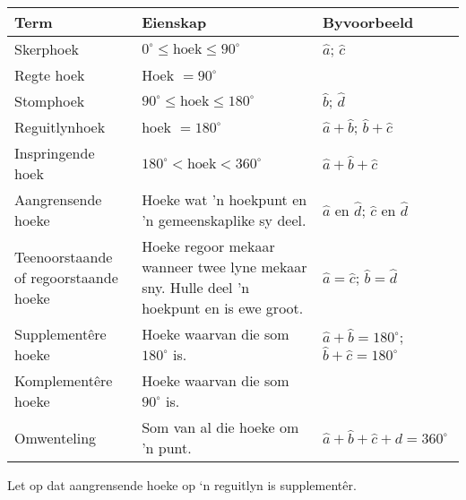 \begin{table}[H]
\begin{center}
\begin{tabular}{|p{3.5cm}|p{4cm}|p{4cm}|} \hline
\textbf{Term} & \textbf{Eienskap} & \textbf{Byvoorbeeld} \\ \hline
Skerphoek & $0^{\circ} \leq \mbox{hoek} \leq 90^{\circ}$ & $\hat{a}$; $\hat{c}$ \\ \hline
Regte hoek & Hoek $= 90^{\circ}$ &  \\ \hline
Stomphoek & $90^{\circ} \leq \mbox{hoek} \leq 180^{\circ}$ & $\hat{b}$; $\hat{d}$ \\ \hline
Reguitlynhoek & hoek $= 180^{\circ}$ & $\hat{a} + \hat{b}$; $\hat{b} + \hat{c}$  \\ \hline
Inspringende hoek & $180^{\circ} < \mbox{hoek} < 360^{\circ}$ &  $\hat{a} + \hat{b} + \hat{c}$\\ \hline
Aangrensende hoeke & Hoeke wat 'n hoekpunt en 'n gemeenskaplike sy deel. & $\hat{a}$ en $\hat{d}$; $\hat{c}$ en $\hat{d}$ \\ \hline
Teenoorstaande of regoorstaande hoeke & Hoeke regoor mekaar wanneer twee lyne mekaar sny. Hulle deel 'n hoekpunt en is ewe groot. & $\hat{a}=\hat{c}$; $\hat{b}=\hat{d}$\\ \hline
Supplementêre hoeke & Hoeke waarvan die som $180^{\circ}$ is. & $\hat{a}+\hat{b}=180^{\circ}$; $\hat{b}+\hat{c}=180^{\circ}$ \\ \hline
Komplementêre hoeke  & Hoeke waarvan die som  $90^{\circ}$ is. & \\ \hline
Omwenteling & Som van al die hoeke om 'n punt. &  $\hat{a}+\hat{b}+\hat{c}+\hat{d}=360^{\circ}$ \\ \hline

\end{tabular}
\end{center}
\end{table}
 Let op dat aangrensende hoeke op ‘n reguitlyn is supplementêr.



